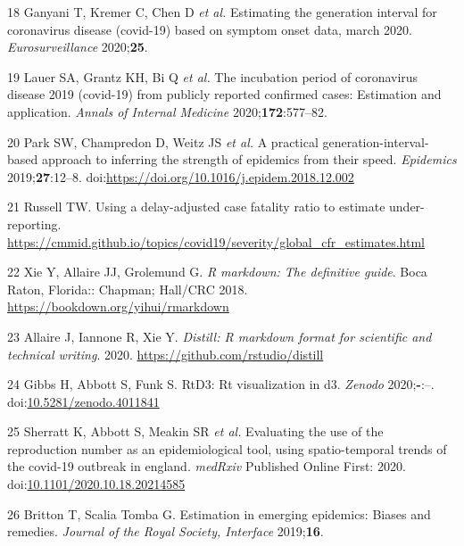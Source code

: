 \documentclass[
]{article}
\begin{document}
\leavevmode\hypertarget{ref-generationinterval}{}%
18 Ganyani T, Kremer C, Chen D \emph{et al.} Estimating the generation
interval for coronavirus disease (covid-19) based on symptom onset data,
march 2020. \emph{Eurosurveillance} 2020;\textbf{25}.

\leavevmode\hypertarget{ref-incubationperiod}{}%
19 Lauer SA, Grantz KH, Bi Q \emph{et al.} The incubation period of
coronavirus disease 2019 (covid-19) from publicly reported confirmed
cases: Estimation and application. \emph{Annals of Internal Medicine}
2020;\textbf{172}:577--82.

\leavevmode\hypertarget{ref-Park2019}{}%
20 Park SW, Champredon D, Weitz JS \emph{et al.} A practical
generation-interval-based approach to inferring the strength of
epidemics from their speed. \emph{Epidemics} 2019;\textbf{27}:12--8.
doi:\href{https://doi.org/https://doi.org/10.1016/j.epidem.2018.12.002}{https://doi.org/10.1016/j.epidem.2018.12.002}

\leavevmode\hypertarget{ref-Russell:BFVkJ6lQ}{}%
21 Russell TW. Using a delay-adjusted case fatality ratio to estimate
under-reporting.
\url{https://cmmid.github.io/topics/covid19/severity/global_cfr_estimates.html}

\leavevmode\hypertarget{ref-rmarkdown}{}%
22 Xie Y, Allaire JJ, Grolemund G. \emph{R markdown: The definitive
guide}. Boca Raton, Florida:: Chapman; Hall/CRC 2018.
\url{https://bookdown.org/yihui/rmarkdown}

\leavevmode\hypertarget{ref-distill}{}%
23 Allaire J, Iannone R, Xie Y. \emph{Distill: R markdown format for
scientific and technical writing}. 2020.
\url{https://github.com/rstudio/distill}

\leavevmode\hypertarget{ref-rtd3}{}%
24 Gibbs H, Abbott S, Funk S. RtD3: Rt visualization in d3.
\emph{Zenodo} 2020;\textbf{-}:--.
doi:\href{https://doi.org/10.5281/zenodo.4011841}{10.5281/zenodo.4011841}

\leavevmode\hypertarget{ref-rt-comparison}{}%
25 Sherratt K, Abbott S, Meakin SR \emph{et al.} Evaluating the use of
the reproduction number as an epidemiological tool, using
spatio-temporal trends of the covid-19 outbreak in england.
\emph{medRxiv} Published Online First: 2020.
doi:\href{https://doi.org/10.1101/2020.10.18.20214585}{10.1101/2020.10.18.20214585}

\leavevmode\hypertarget{ref-Britton:2019gf}{}%
26 Britton T, Scalia Tomba G. Estimation in emerging epidemics: Biases
and remedies. \emph{Journal of the Royal Society, Interface}
2019;\textbf{16}.
\end{document}
